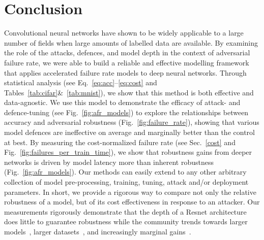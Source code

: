 \section{Conclusion}
Convolutional neural networks have shown to be widely applicable to a large number of fields when large amounts of labelled data are available. By examining the role of the attacks, defences, and model depth in the context of adversarial failure rate, we were able to build a reliable and effective modelling framework that applies accelerated failure rate models to deep neural networks. Through statistical analysis (see Eq.~\ref{eq:acc}--\ref{eq:cost} and Tables~\ref{tab:cifar}\&~\ref{tab:mnist}), we show that this method is both effective and data-agnostic.  We use this model to demonstrate the efficacy of attack- and defence-tuning (see Fig.~\ref{fig:afr_models}) to  explore the relationships between accuracy and adversarial robustness (Fig.~\ref{fig:failure_rate}), showing that various model defences are ineffective on average and marginally better than the control at best.
By measuring the cost-normalized failure rate (see Sec.~\ref{cost} and Fig.~\ref{fig:failures_per_train_time}), we show that robustness gains from deeper networks is driven by model latency more than inherent robustness (Fig.~\ref{fig:afr_models}). Our methods can easily extend to any other arbitrary collection of model pre-processing, training, tuning, attack and/or deployment parameters. In short, we provide a rigorous way to compare not only the relative robustness of a model, but of its cost effectiveness in response to an attacker. Our measurements rigorously demonstrate  that the depth of a Resnet architecture does little to guarantee robustness while the community trends towards larger models~\cite{desislavov2021compute}, larger datasets~\cite{desislavov2021compute,bailly2022effects}, and increasingly marginal gains~\cite{sun2017revisiting}.
